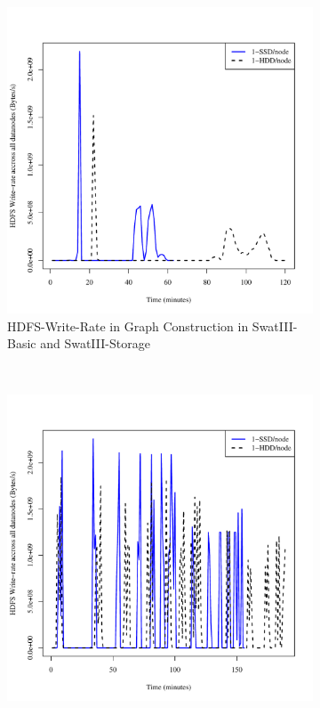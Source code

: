 \documentclass[conference]{IEEEtran}
\begin{document}
\begin{figure}[t]
        \begin{subfigure}[b]{0.2\textwidth}
                \includegraphics[width=\textwidth]{Figure/SystemData/Plots/BGHddSsdHdfsWrIops.pdf}
                \caption{HDFS-Write-Rate in Graph Construction in SwatIII-Basic and SwatIII-Storage}
                \label{fig:BGHddSsdHdfsWrIops}
        \end{subfigure}
        ~ %
        \begin{subfigure}[b]{0.2\textwidth}
                \includegraphics[width=\textwidth]{Figure/SystemData/Plots/ECHddSsdHdfsWrIops.pdf}

\end{subfigure}
\end{figure}
\end{document}

